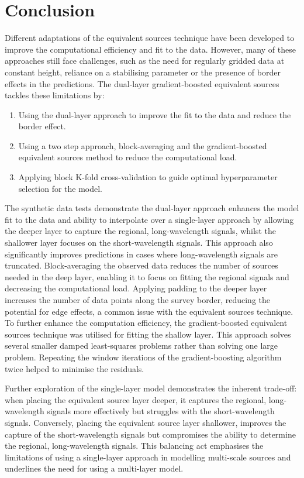 \section{Conclusion}

Different adaptations of the equivalent sources technique have been developed to improve the computational efficiency and fit to the data. However, many of these approaches still face challenges, such as the need for regularly gridded data at constant height, reliance on a stabilising parameter or the presence of border effects in the predictions. The dual-layer gradient-boosted equivalent sources tackles these limitations by:

\begin{enumerate}
    \item Using the dual-layer approach to improve the fit to the data and reduce the border effect.
    \item Using a two step approach, block-averaging and the gradient-boosted equivalent sources method to reduce the computational load.
    \item Applying block K-fold cross-validation to guide optimal hyperparameter selection for the model.
\end{enumerate}

The synthetic data tests demonstrate the dual-layer approach enhances the model fit to the data and ability to interpolate over a single-layer approach by allowing the deeper layer to capture the regional, long-wavelength signals, whilst the shallower layer focuses on the short-wavelength signals. This approach also significantly improves predictions in cases where long-wavelength signals are truncated. Block-averaging the observed data reduces the number of sources needed in the deep layer, enabling it to focus on fitting the regional signals and decreasing the computational load. Applying padding to the deeper layer increases the number of data points along the survey border, reducing the potential for edge effects, a common issue with the equivalent sources technique. To further enhance the computation efficiency, the gradient-boosted equivalent sources technique was utilised for fitting the shallow layer. This approach solves several smaller damped least-squares problems rather than solving one large problem. Repeating the window iterations of the gradient-boosting algorithm twice helped to minimise the residuals.

Further exploration of the single-layer model demonstrates the inherent trade-off: when placing the equivalent source layer deeper, it captures the regional, long-wavelength signals more effectively but struggles with the short-wavelength signals. Conversely, placing the equivalent source layer shallower, improves the capture of the short-wavelength signals but compromises the ability to determine the regional, long-wavelength signals. This balancing act emphasises the limitations of using a single-layer approach in modelling multi-scale sources and underlines the need for using a multi-layer model.

